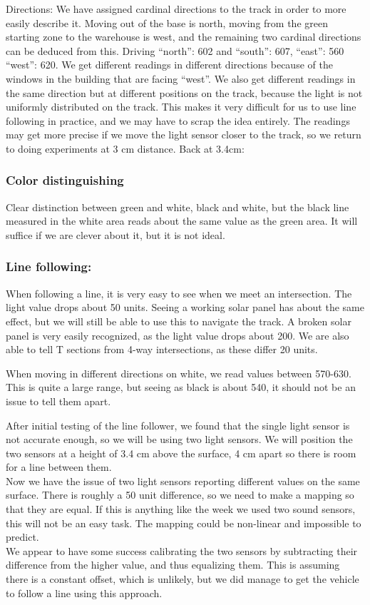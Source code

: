 Directions: We have assigned cardinal directions to the track in order
to more easily describe it. Moving out of the base is north, moving from
the green starting zone to the warehouse is west, and the remaining two
cardinal directions can be deduced from this. Driving ``north'': 602 and
``south'': 607, ``east'': 560 ``west'': 620. We get different readings
in different directions because of the windows in the building that are
facing ``west''. We also get different readings in the same direction
but at different positions on the track, because the light is not
uniformly distributed on the track. This makes it very difficult for us
to use line following in practice, and we may have to scrap the idea
entirely. The readings may get more precise if we move the light sensor
closer to the track, so we return to doing experiments at 3 cm distance.
Back at 3.4cm:

\subsubsection{Color distinguishing}
Clear distinction between
green and white, black and white, but the black line measured in the
white area reads about the same value as the green area. It will suffice
if we are clever about it, but it is not ideal.

\subsubsection{Line following:}

When following a line, it is very easy to see when we meet an
intersection. The light value drops about 50 units. Seeing a working
solar panel has about the same effect, but we will still be able to use
this to navigate the track. A broken solar panel is very easily
recognized, as the light value drops about 200. We are also able to tell
T sections from 4-way intersections, as these differ 20 units.

When moving in different directions on white, we read values between
570-630. This is quite a large range, but seeing as black is about 540,
it should not be an issue to tell them apart.

After initial testing of the line follower, we found that the single
light sensor is not accurate enough, so we will be using two light
sensors. We will position the two sensors at a height of 3.4 cm above
the surface, 4 cm apart so there is room for a line between them.\\Now
we have the issue of two light sensors reporting different values on the
same surface. There is roughly a 50 unit difference, so we need to make
a mapping so that they are equal. If this is anything like the week we
used two sound sensors, this will not be an easy task. The mapping could
be non-linear and impossible to predict.\\We appear to have some success
calibrating the two sensors by subtracting their difference from the
higher value, and thus equalizing them. This is assuming there is a
constant offset, which is unlikely, but we did manage to get the vehicle
to follow a line using this approach.


